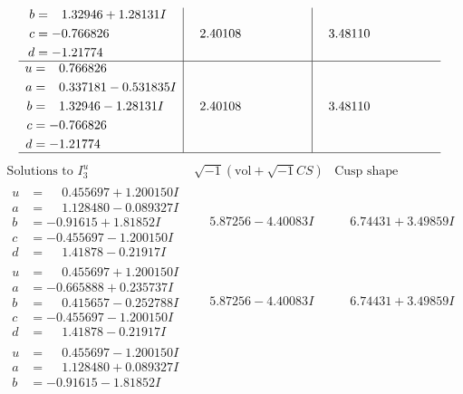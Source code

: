 \documentclass[1p]{elsarticle_modified}
\theoremstyle{definition}
\newcommand{\I}{\sqrt{-1}}
\begin{document}
$$\begin{array}{c|c|c}
\begin{aligned}
b &= \phantom{-}1.32946 + 1.28131 I \\
c &= -0.766826\phantom{ +0.000000I} \\
d &= -1.21774\phantom{ +0.000000I}\end{aligned}
 & \phantom{-}2.40108\phantom{ +0.000000I} & \phantom{-}3.48110\phantom{ +0.000000I} \\ \hline\begin{aligned}
u &= \phantom{-}0.766826\phantom{ +0.000000I} \\
a &= \phantom{-}0.337181 - 0.531835 I \\
b &= \phantom{-}1.32946 - 1.28131 I \\
c &= -0.766826\phantom{ +0.000000I} \\
d &= -1.21774\phantom{ +0.000000I}\end{aligned}
 & \phantom{-}2.40108\phantom{ +0.000000I} & \phantom{-}3.48110\phantom{ +0.000000I}\\
 \hline 
 \end{array}$$\newpage$$\begin{array}{c|c|c}  
\text{Solutions to }I^u_{3}& \I (\text{vol} + \sqrt{-1}CS) & \text{Cusp shape}\\
 \hline 
\begin{aligned}
u &= \phantom{-}0.455697 + 1.200150 I \\
a &= \phantom{-}1.128480 - 0.089327 I \\
b &= -0.91615 + 1.81852 I \\
c &= -0.455697 - 1.200150 I \\
d &= \phantom{-}1.41878 - 0.21917 I\end{aligned}
 & \phantom{-}5.87256 - 4.40083 I & \phantom{-}6.74431 + 3.49859 I \\ \hline\begin{aligned}
u &= \phantom{-}0.455697 + 1.200150 I \\
a &= -0.665888 + 0.235737 I \\
b &= \phantom{-}0.415657 - 0.252788 I \\
c &= -0.455697 - 1.200150 I \\
d &= \phantom{-}1.41878 - 0.21917 I\end{aligned}
 & \phantom{-}5.87256 - 4.40083 I & \phantom{-}6.74431 + 3.49859 I \\ \hline\begin{aligned}
u &= \phantom{-}0.455697 - 1.200150 I \\
a &= \phantom{-}1.128480 + 0.089327 I \\
b &= -0.91615 - 1.81852 I \\

\end{aligned}
\end{array}$$
\end{document}
